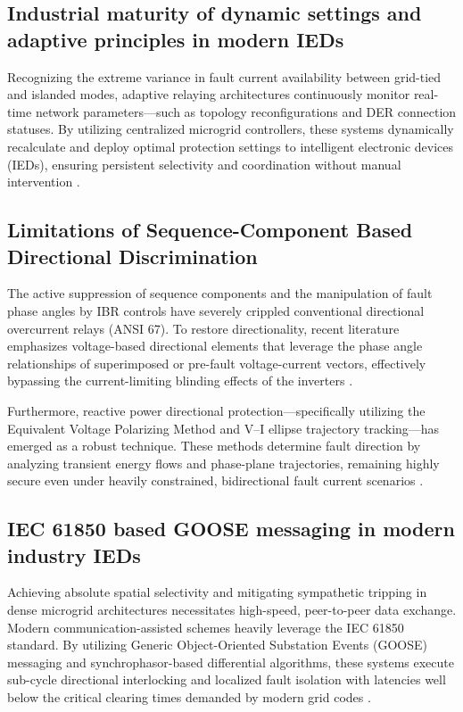 \subsection{Industrial maturity of dynamic settings and adaptive principles in modern IEDs}
Recognizing the extreme variance in fault current availability between grid-tied and islanded modes, adaptive relaying architectures continuously monitor real-time network parameters—such as topology reconfigurations and DER connection statuses. By utilizing centralized microgrid controllers, these systems dynamically recalculate and deploy optimal protection settings to intelligent electronic devices (IEDs), ensuring persistent selectivity and coordination without manual intervention \cite{patel2023hardware}.

\subsection{Limitations of Sequence-Component Based Directional Discrimination}
The active suppression of sequence components and the manipulation of fault phase angles by IBR controls have severely crippled conventional directional overcurrent relays (ANSI 67). To restore directionality, recent literature emphasizes voltage-based directional elements that leverage the phase angle relationships of superimposed or pre-fault voltage-current vectors, effectively bypassing the current-limiting blinding effects of the inverters \cite{seq_directional_2024}.

Furthermore, reactive power directional protection—specifically utilizing the Equivalent Voltage Polarizing Method and V–I ellipse trajectory tracking—has emerged as a robust technique. These methods determine fault direction by analyzing transient energy flows and phase-plane trajectories, remaining highly secure even under heavily constrained, bidirectional fault current scenarios \cite{energy_directional_2023}.

\subsection{IEC 61850 based GOOSE messaging  in modern industry IEDs}

Achieving absolute spatial selectivity and mitigating sympathetic tripping in dense microgrid architectures necessitates high-speed, peer-to-peer data exchange. Modern communication-assisted schemes heavily leverage the IEC 61850 standard. By utilizing Generic Object-Oriented Substation Events (GOOSE) messaging and synchrophasor-based differential algorithms, these systems execute sub-cycle directional interlocking and localized fault isolation with latencies well below the critical clearing times demanded by modern grid codes \cite{aftab2018performance}.

